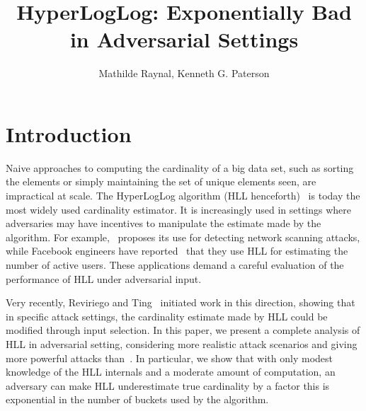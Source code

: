 \documentclass{IEEEtran}
\title{HyperLogLog: Exponentially Bad in Adversarial Settings}
\author{Mathilde Raynal, Kenneth G. Paterson}
\begin{document}
\maketitle


\IEEEdisplaynontitleabstractindextext

\section{Introduction}
Naive approaches to computing the cardinality of a big data set, such as sorting the elements or simply maintaining the set of unique elements seen, are impractical at scale. The HyperLogLog algorithm (HLL henceforth)~\cite{loglog,hll2} is today the most widely used cardinality estimator. It is increasingly used in settings where adversaries may have  incentives to manipulate the estimate made by the algorithm. For example,~\cite{portscanhll} proposes its use for detecting network scanning attacks, while Facebook engineers have reported~\cite{fbhll} that they use HLL for estimating the number of active users. These applications demand a careful evaluation of the performance of HLL under adversarial input. 

Very recently, Reviriego and Ting~\cite{hllvuln} initiated work in this direction, showing that in specific attack settings, the cardinality estimate made by HLL could be modified through input selection. In this paper, we present a complete analysis of HLL in adversarial setting, considering more realistic attack scenarios and giving more powerful attacks than~\cite{hllvuln}. In particular, we show that with only modest knowledge of the HLL internals and a moderate amount of computation, an adversary can make HLL underestimate true cardinality by a factor this is exponential in the number of buckets used by the algorithm.
\end{document}
